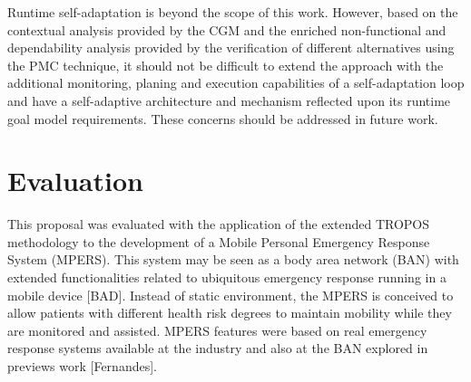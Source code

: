 
Runtime self-adaptation is beyond the scope of this work. However, based on the contextual analysis provided by the CGM and the enriched non-functional and dependability analysis provided by the verification of different alternatives using the PMC technique, it should not be difficult to extend the approach with the additional monitoring, planing and execution capabilities of a self-adaptation loop and have a self-adaptive architecture and mechanism reflected upon its runtime goal model requirements. These concerns should be addressed in future work.




\section{Evaluation}

This proposal was evaluated with the application of the extended TROPOS methodology to the development of a Mobile Personal Emergency Response System (MPERS). This system may be seen as a body area network (BAN) with extended functionalities related to ubiquitous emergency response running in a mobile device [BAD]. Instead of static environment, the MPERS is conceived to allow patients with different health risk degrees to maintain mobility while they are monitored and assisted. MPERS features were based on real emergency response systems available at the industry and also at the BAN explored in previews work [Fernandes]. 

